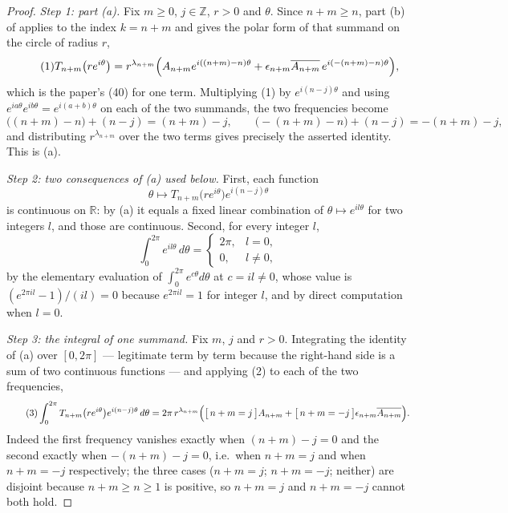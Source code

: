 \begin{proof}
\emph{Step 1: part (a).}  Fix $m\ge0$, $j\in\mathbb{Z}$, $r>0$ and $\theta$.
Since $n+m\ge n$, part (b) of  applies to the index
$k=n+m$ and gives the polar form of that summand on the circle of radius $r$,
\begin{equation}\tag{1}
  T_{n+m}\bigl(re^{i\theta}\bigr)
  =r^{\lambda_{n+m}}\Bigl(A_{n+m}e^{i((n+m)-n)\theta}
    +\epsilon_{n+m}\overline{A_{n+m}}\,e^{i(-(n+m)-n)\theta}\Bigr),
\end{equation}
which is the paper's (40) for one term.  Multiplying (1) by
$e^{i(n-j)\theta}$ and using $e^{ia\theta}e^{ib\theta}=e^{i(a+b)\theta}$ on
each of the two summands, the two frequencies become
\[
  \bigl((n+m)-n\bigr)+(n-j)=(n+m)-j,
  \qquad
  \bigl(-(n+m)-n\bigr)+(n-j)=-(n+m)-j,
\]
and distributing $r^{\lambda_{n+m}}$ over the two terms gives precisely the
asserted identity.  This is (a).

\emph{Step 2: two consequences of (a) used below.}  First, each function
\[
  \theta\mapsto T_{n+m}\bigl(re^{i\theta}\bigr)e^{i(n-j)\theta}
\]
is continuous on $\mathbb{R}$: by (a) it equals a fixed linear combination of
$\theta\mapsto e^{il\theta}$ for two integers $l$, and those are continuous.
Second, for every integer $l$,
\begin{equation}\tag{2}
  \int_0^{2\pi}e^{il\theta}\,d\theta=\begin{cases}2\pi,&l=0,\\0,&l\ne0,\end{cases}
\end{equation}
by the elementary evaluation of $\int_0^{2\pi}e^{c\theta}d\theta$ at
$c=il\ne0$, whose value is $(e^{2\pi il}-1)/(il)=0$ because
$e^{2\pi il}=1$ for integer $l$, and by direct computation when $l=0$.

\emph{Step 3: the integral of one summand.}  Fix $m$, $j$ and $r>0$.
Integrating the identity of (a) over $[0,2\pi]$ --- legitimate term by term
because the right-hand side is a sum of two continuous functions --- and
applying (2) to each of the two frequencies,
\begin{equation}\tag{3}
  \int_0^{2\pi}T_{n+m}\bigl(re^{i\theta}\bigr)e^{i(n-j)\theta}\,d\theta
  =2\pi\,r^{\lambda_{n+m}}
    \Bigl(\bigl[\,n+m=j\,\bigr]A_{n+m}
      +\bigl[\,n+m=-j\,\bigr]\epsilon_{n+m}\overline{A_{n+m}}\Bigr).
\end{equation}
Indeed the first frequency vanishes exactly when $(n+m)-j=0$ and the second
exactly when $-(n+m)-j=0$, i.e.\ when $n+m=j$ and when $n+m=-j$ respectively;
the three cases ($n+m=j$; $n+m=-j$; neither) are disjoint because $n+m\ge n\ge1$
is positive, so $n+m=j$ and $n+m=-j$ cannot both hold.


\end{proof}
